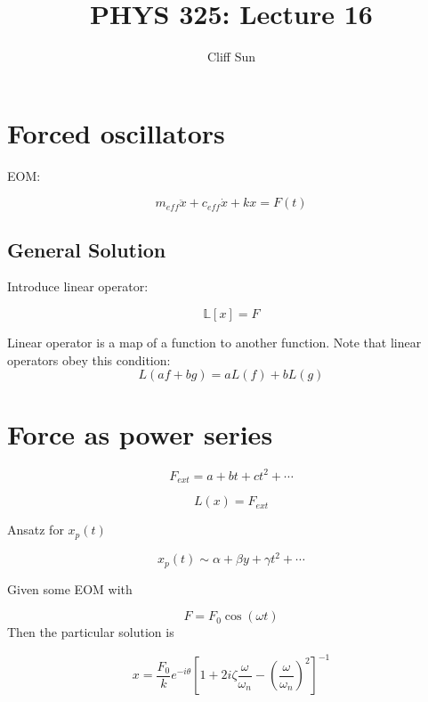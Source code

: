 \documentclass{article}
\title{PHYS 325: Lecture 16}
\author{Cliff Sun}
\newtheorem{one minute paper}[theorem]{One Minute Paper}
\begin{document}
\maketitle

\section*{Forced oscillators}

EOM:

\begin{equation}
    m_{eff}\ddot{x} + c_{eff}\dot{x} + kx = F(t)
\end{equation}

\subsection*{General Solution}

Introduce linear operator:

\begin{equation}
    \mathbb{L}[x] = F
\end{equation}

Linear operator is a map of a function to another function. Note that linear operators obey this condition:
\begin{equation}
    L(af + bg) = aL(f) + bL(g)
\end{equation}

\section*{Force as power series}

\begin{equation}
    F_{ext} = a + bt + ct^2 + \cdots
\end{equation}

\begin{equation}
    L(x) = F_{ext}
\end{equation}

Ansatz for $x_p(t)$

\begin{equation}
    x_p(t) \sim \alpha + \beta y + \gamma t^2 + \cdots 
\end{equation}

Given some EOM with 

\begin{equation}
    F = F_0\cos(\omega t)
\end{equation}
Then the particular solution is 

\begin{equation}
    x = \frac{F_0}{k}e^{-i\theta}\left[1 + 2i\zeta\frac{\omega}{\omega_n} - \left(\frac{\omega}{\omega_n}\right)^2\right]^{-1}
\end{equation}
\end{document}
